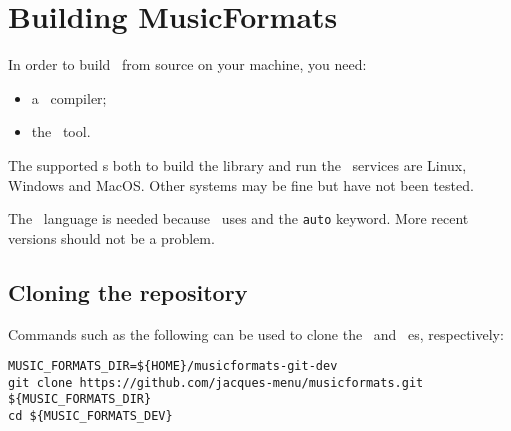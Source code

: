 



\chapter{Building MusicFormats}

In order to build \mf\ from source on your machine, you need:
\begin{itemize}
\item a \CPlusplus\ compiler;
\item the \cmake\ tool.
\end{itemize}

The supported \OS s both to build the library and run the \CLI\ services are Linux, Windows and MacOS. Other systems may be fine but have not been tested.

The \CPlusplus\ language is needed because \mf\ uses  and the {\tt auto} keyword. More recent versions should not be a problem.


\section{Cloning the repository}

Commands such as the following can be used to clone the \master\ and \version\ \branch es, respectively:

\begin{lstlisting}[language=Terminal]
MUSIC_FORMATS_DIR=${HOME}/musicformats-git-dev
git clone https://github.com/jacques-menu/musicformats.git ${MUSIC_FORMATS_DIR}
cd ${MUSIC_FORMATS_DEV}
\end{lstlisting}

